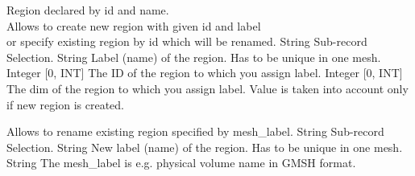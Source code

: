 \begin{RecordType}
	{}
	{} %
	{} %
	{} %
	{{{Region declared by id and name.}\\{
Allows to create new region with given id and label}\\{
or specify existing region by id which will be renamed.}}}
		\KeyItem
			{}
			{{String}}
			{\textrangle}
			{} %
			{{{Sub-record Selection.}}}
		\KeyItem
			{}
			{{String}}
			{\textrangle}
			{} %
			{{{Label (name) of the region. Has to be unique in one mesh.}}}
		\KeyItem
			{}
			{{Integer [0, INT]}}
			{\textrangle}
			{} %
			{{{The ID of the region to which you assign label.}}}
		\KeyItem
			{}
			{{Integer [0, INT]}}
			{\textrangle}
			{} %
			{{{The dim of the region to which you assign label. Value is taken into account only if new region is created.}}}
\end{RecordType}
\begin{RecordType}
	{}
	{} %
	{} %
	{} %
	{{{Allows to rename existing region specified by mesh{\_}label.}}}
		\KeyItem
			{}
			{{String}}
			{\textrangle}
			{} %
			{{{Sub-record Selection.}}}
		\KeyItem
			{}
			{{String}}
			{\textrangle}
			{} %
			{{{New label (name) of the region. Has to be unique in one mesh.}}}
		\KeyItem
			{}
			{{String}}
			{\textrangle}
			{} %
			{{{The mesh{\_}label is e.g. physical volume name in GMSH format.}}}
\end{RecordType}
